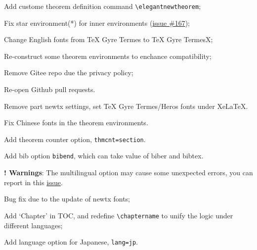 \documentclass[11pt]{boyogalaelegantbook}
\begin{document}

\begin{change}
  \item Add custome theorem definition command \lstinline{\elegantnewtheorem};
  \item Fix star environment(*) for inner environments (\href{https://github.com/ElegantLaTeX/ElegantBook/issues/167}{issue \#167});
  \item Change English fonts from TeX Gyre Termes to TeX Gyre TermesX;
  \item Re-construct some theorem environments to enchance compatibility;
  \item Remove Gitee repo due the privacy policy;
  \item Re-open Github pull requests.
\end{change}





\begin{change}
  \item Remove part newtx settings, set TeX Gyre Termes/Heros fonts under \textsf{XeLaTeX}.
  \item Fix Chinese fonts in the theorem environments.
  \item Add theorem counter option, \lstinline{thmcnt=section}.
  \item Add bib option \lstinline{bibend}, which can take value of biber and bibtex.
  \item \textbf{! Warnings}: The multilingual option may cause some unexpected errors, you can report in this \href{https://github.com/ElegantLaTeX/ElegantBook/issues/170}{issue}.
\end{change}




\begin{change}
  \item Bug fix due to the update of newtx fonts;
  \item Add `Chapter' in TOC, and redefine \lstinline{\chaptername} to unify the logic under different languages;
  \item Add language option for Japanese, \lstinline{lang=jp}.
\end{change}


\end{document}

